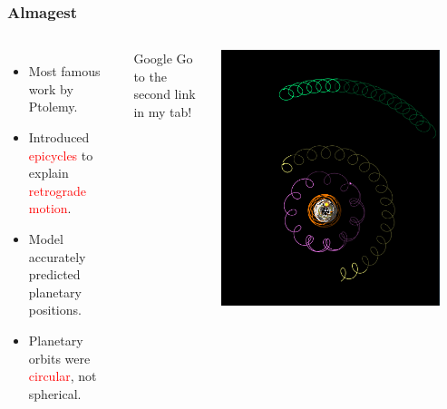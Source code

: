 \documentclass[aspectratio=1611, 9pt]{beamer}
\begin{document}
\begin{frame}
  \frametitle{Almagest}
  \begin{columns}
    \begin{itemize}
      \item Most famous work by Ptolemy.
      \item Introduced \textcolor{red}{epicycles} to explain \textcolor{red}{retrograde motion}.
      \item Model accurately predicted planetary positions.
      \item Planetary orbits were \textcolor{red}{circular}, not spherical.
    \end{itemize}
    \begin{alertblock}{Google}
      Go to the second link in my tab!
    \end{alertblock}

    \begin{center}
      \includegraphics[width=0.9\textwidth]{pictures/geocentric.png}
    \end{center}
  \end{columns}
\end{frame}
\end{document}
